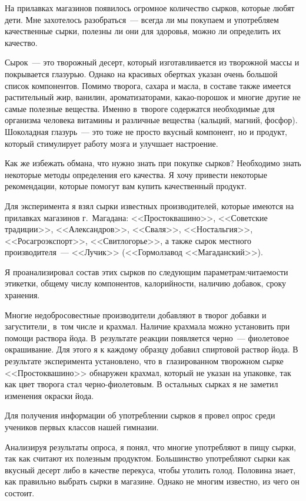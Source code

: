 На прилавках магазинов появилось огромное количество сырков, которые любят дети. Мне захотелось разобраться~--- всегда ли мы покупаем и употребляем качественные сырки, полезны ли они для здоровья, можно ли определить их качество.

Сырок~---  это творожный десерт, который изготавливается из творожной массы и покрывается глазурью. Однако на красивых обертках указан очень большой список компонентов. Помимо творога, сахара и масла, в составе также имеется растительный жир, ванилин, ароматизаторами, какао-порошок и многие другие не самые полезные вещества. Именно в~твороге содержатся необходимые для организма человека витамины и различные вещества (кальций, магний, фосфор). Шоколадная глазурь~--- это тоже не просто вкусный компонент, но и продукт, который стимулирует работу мозга и улучшает настроение.

Как же избежать обмана, что нужно знать при покупке сырков? Необходимо знать некоторые методы определения его качества. Я  хочу привести  некоторые рекомендации, которые помогут вам купить качественный продукт.

Для эксперимента я взял сырки известных производителей, которые имеются на прилавках магазинов г.~Магадана: <<Простоквашино>>, <<Советские традиции>>, <<Александров>>, <<Сваля>>, <<Ностальгия>>, <<Росагроэкспорт>>, <<Свитлогорье>>, а также сырок местного производителя~--- <<Лучик>> (<<Гормолзавод <<Магаданский>>).

Я проанализировал состав этих сырков по следующим параметрам:читаемости этикетки, общему числу компонентов, калорийности, наличию добавок, сроку хранения.

Многие недобросовестные производители добавляют в творог добавки и загустители¸ в~том числе и крахмал. Наличие крахмала можно установить при помощи раствора йода. В~результате реакции появляется черно~--- фиолетовое окрашивание. Для этого я к каждому образцу добавил спиртовой раствор йода. В результате эксперимента установлено, что в~глазированном творожном сырке <<Простоквашино>> обнаружен крахмал, который не указан на упаковке, так как цвет творога стал черно-фиолетовым. В остальных сырках я не заметил изменения окраски йода.

Для получения информации об употреблении сырков я провел опрос среди учеников первых классов нашей гимназии.

Анализируя результаты опроса, я понял, что многие употребляют в пищу сырки, так как считают их полезным продуктом. Большинство употребляют сырки как вкусный десерт либо в качестве перекуса, чтобы утолить голод. Половина знает, как правильно выбрать сырки в магазине. Однако не многим известно, из чего он состоит.

